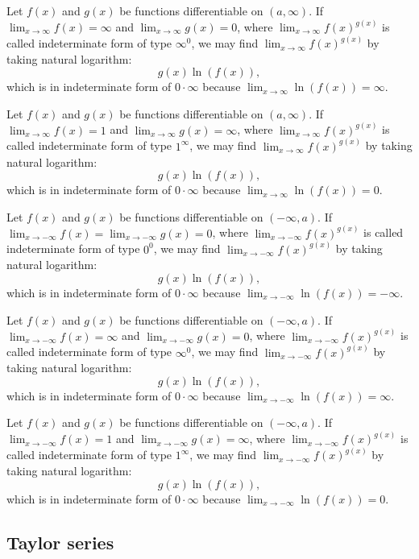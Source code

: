 \documentclass[a4paper,12pt]{report}
\begin{document}
\begin{itemize}
\begin{itemize}
Let $f(x)$ and $g(x)$ be functions differentiable on $(a,\infty)$. If $\lim_{x\to\infty}f(x)=\infty$ and $\lim_{x\to\infty}g(x)=0$, where $\lim_{x\to\infty}f(x)^{g(x)}$ is called indeterminate form of type $\infty^0$, we may find $\lim_{x\to\infty}f(x)^{g(x)}$ by taking natural logarithm:
\[g(x)\ln(f(x)),\]
which is in indeterminate form of $0\cdot\infty$ because $\lim_{x\to\infty}\ln(f(x))=\infty$.

Let $f(x)$ and $g(x)$ be functions differentiable on $(a,\infty)$. If $\lim_{x\to\infty}f(x)=1$ and $\lim_{x\to\infty}g(x)=\infty$, where $\lim_{x\to\infty}f(x)^{g(x)}$ is called indeterminate form of type $1^{\infty}$, we may find $\lim_{x\to\infty}f(x)^{g(x)}$ by taking natural logarithm:
\[g(x)\ln(f(x)),\]
which is in indeterminate form of $0\cdot\infty$ because $\lim_{x\to\infty}\ln(f(x))=0$.

Let $f(x)$ and $g(x)$ be functions differentiable on $(-\infty,a)$. If $\lim_{x\to -\infty}f(x)=\lim_{x\to -\infty}g(x)=0$, where $\lim_{x\to -\infty}f(x)^{g(x)}$ is called indeterminate form of type $0^0$, we may find $\lim_{x\to -\infty}f(x)^{g(x)}$ by taking natural logarithm:
\[g(x)\ln(f(x)),\]
which is in indeterminate form of $0\cdot\infty$ because $\lim_{x\to -\infty}\ln(f(x))=-\infty$.

Let $f(x)$ and $g(x)$ be functions differentiable on $(-\infty,a)$. If $\lim_{x\to -\infty}f(x)=\infty$ and $\lim_{x\to -\infty}g(x)=0$, where $\lim_{x\to -\infty}f(x)^{g(x)}$ is called indeterminate form of type $\infty^0$, we may find $\lim_{x\to -\infty}f(x)^{g(x)}$ by taking natural logarithm:
\[g(x)\ln(f(x)),\]
which is in indeterminate form of $0\cdot\infty$ because $\lim_{x\to -\infty}\ln(f(x))=\infty$.

Let $f(x)$ and $g(x)$ be functions differentiable on $(-\infty,a)$. If $\lim_{x\to -\infty}f(x)=1$ and $\lim_{x\to -\infty}g(x)=\infty$, where $\lim_{x\to -\infty}f(x)^{g(x)}$ is called indeterminate form of type $1^{\infty}$, we may find $\lim_{x\to -\infty}f(x)^{g(x)}$ by taking natural logarithm:
\[g(x)\ln(f(x)),\]
which is in indeterminate form of $0\cdot\infty$ because $\lim_{x\to -\infty}\ln(f(x))=0$.
\subsection{Taylor series}

\end{itemize}
\end{itemize}
\end{document}
